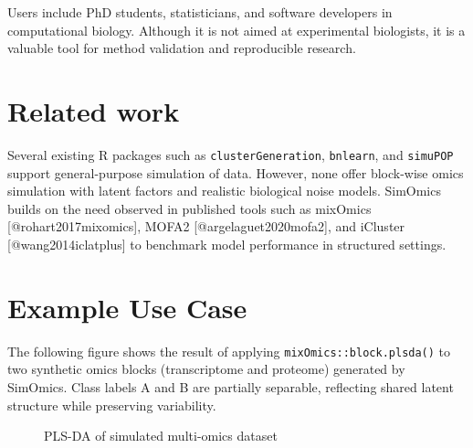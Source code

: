 Users include PhD students, statisticians, and software developers in
computational biology. Although it is not aimed at experimental
biologists, it is a valuable tool for method validation and reproducible
research.

\section{Related work}\label{related-work}

Several existing R packages such as \texttt{clusterGeneration},
\texttt{bnlearn}, and \texttt{simuPOP} support general-purpose
simulation of data. However, none offer block-wise omics simulation with
latent factors and realistic biological noise models. SimOmics builds on
the need observed in published tools such as mixOmics
{[}@rohart2017mixomics{]}, MOFA2 {[}@argelaguet2020mofa2{]}, and
iCluster {[}@wang2014iclatplus{]} to benchmark model performance in
structured settings.

\section{Example Use Case}\label{example-use-case}

The following figure shows the result of applying
\texttt{mixOmics::block.plsda()} to two synthetic omics blocks
(transcriptome and proteome) generated by SimOmics. Class labels A and B
are partially separable, reflecting shared latent structure while
preserving variability.

\begin{figure}
\centering
{}
\caption{PLS-DA of simulated multi-omics dataset}
\end{figure}

